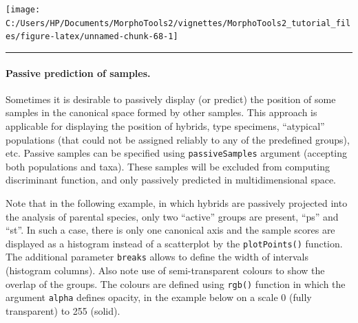 \documentclass[
]{article}
\begin{document}
\begin{center}\texttt{[image: C:/Users/HP/Documents/MorphoTools2/vignettes/MorphoTools2\_tutorial\_files/figure-latex/unnamed-chunk-68-1]} \end{center}

\begin{center}\rule{0.5\linewidth}{0.5pt}\end{center}

\hypertarget{passive-prediction-of-samples.}{%
\paragraph{Passive prediction of
samples.}\label{passive-prediction-of-samples.}}

Sometimes it is desirable to passively display (or predict) the position
of some samples in the canonical space formed by other samples. This
approach is applicable for displaying the position of hybrids, type
specimens, ``atypical'' populations (that could not be assigned reliably
to any of the predefined groups), etc. Passive samples can be specified
using \texttt{passiveSamples} argument (accepting both populations and
taxa). These samples will be excluded from computing discriminant
function, and only passively predicted in multidimensional space.

Note that in the following example, in which hybrids are passively
projected into the analysis of parental species, only two ``active''
groups are present, ``ps'' and ``st''. In such a case, there is only one
canonical axis and the sample scores are displayed as a histogram
instead of a scatterplot by the \texttt{plotPoints()} function. The
additional parameter \texttt{breaks} allows to define the width of
intervals (histogram columns). Also note use of semi-transparent colours
to show the overlap of the groups. The colours are defined using
\texttt{rgb()} function in which the argument \texttt{alpha} defines
opacity, in the example below on a scale 0 (fully transparent) to 255
(solid).
\end{document}
